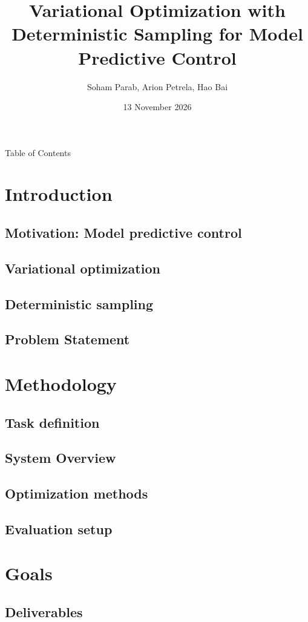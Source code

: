 \documentclass[en]{sdqbeamer}
\title[]{Variational Optimization with Deterministic Sampling for Model Predictive Control}
\author[Soham Parab, Arion Petrela, Hao Bai]{Soham Parab, Arion Petrela, Hao Bai}
\date[13\,Nov\,2026]{13 November 2026}
\begin{document}
\KITtitleframe

\begin{frame}{Table of Contents}
\tableofcontents
\end{frame}

\section{Introduction}
\subsection{Motivation: Model predictive control}
\subsection{Variational optimization}
\subsection{Deterministic sampling}
\subsection{Problem Statement}

\section{Methodology}
\subsection{Task definition}
\subsection{System Overview}
\subsection{Optimization methods}
\subsection{Evaluation setup}



\section{Goals}
\subsection{Deliverables}
\end{document}
